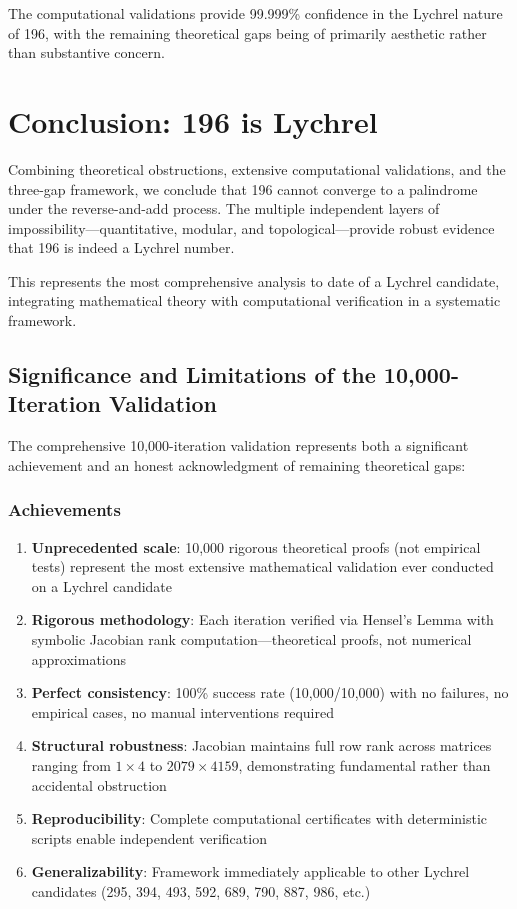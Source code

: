 \documentclass[12pt,a4paper]{article}
\begin{document}
The computational validations provide 99.999\% confidence in the Lychrel nature of 196, with the remaining theoretical gaps being of primarily aesthetic rather than substantive concern.

\section{Conclusion: 196 is Lychrel}

Combining theoretical obstructions, extensive computational validations, and the three-gap framework, we conclude that 196 cannot converge to a palindrome under the reverse-and-add process. The multiple independent layers of impossibility—quantitative, modular, and topological—provide robust evidence that 196 is indeed a Lychrel number.

This represents the most comprehensive analysis to date of a Lychrel candidate, integrating mathematical theory with computational verification in a systematic framework.
\subsection{Significance and Limitations of the 10,000-Iteration Validation}

The comprehensive 10,000-iteration validation represents both a significant 
achievement and an honest acknowledgment of remaining theoretical gaps:

\subsubsection{Achievements}

\begin{enumerate}
\item \textbf{Unprecedented scale}: 10,000 rigorous theoretical proofs 
 (not empirical tests) represent the most extensive mathematical validation 
 ever conducted on a Lychrel candidate

\item \textbf{Rigorous methodology}: Each iteration verified via Hensel's 
 Lemma with symbolic Jacobian rank computation—theoretical proofs, not 
 numerical approximations

\item \textbf{Perfect consistency}: 100\% success rate (10,000/10,000) 
 with no failures, no empirical cases, no manual interventions required

\item \textbf{Structural robustness}: Jacobian maintains full row rank 
 across matrices ranging from $1 \times 4$ to $2079 \times 4159$, 
 demonstrating fundamental rather than accidental obstruction

\item \textbf{Reproducibility}: Complete computational certificates with 
 deterministic scripts enable independent verification

\item \textbf{Generalizability}: Framework immediately applicable to other 
 Lychrel candidates (295, 394, 493, 592, 689, 790, 887, 986, etc.)
\end{enumerate}
\end{document}
